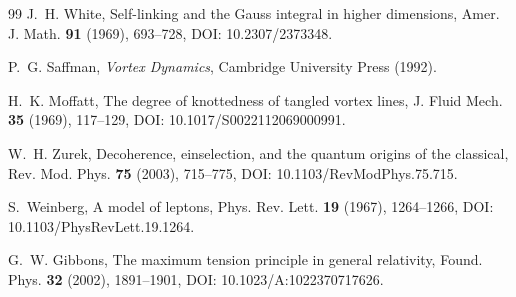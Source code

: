 \documentclass[11pt]{article}
\theoremstyle{definition}
\theoremstyle{plain}
\theoremstyle{remark}
\begin{document}
\begin{thebibliography}{99}
            J.~H. White,
            \newblock Self-linking and the Gauss integral in higher dimensions,
            \newblock Amer. J. Math. \textbf{91} (1969), 693--728,
            \newblock DOI: 10.2307/2373348.

            P.~G. Saffman,
            \newblock \emph{Vortex Dynamics},
            \newblock Cambridge University Press (1992).

            H.~K. Moffatt,
            \newblock The degree of knottedness of tangled vortex lines,
            \newblock J. Fluid Mech. \textbf{35} (1969), 117--129,
            \newblock DOI: 10.1017/S0022112069000991.

            W.~H. Zurek,
            \newblock Decoherence, einselection, and the quantum origins of the classical,
            \newblock Rev. Mod. Phys. \textbf{75} (2003), 715--775,
            \newblock DOI: 10.1103/RevModPhys.75.715.

            S.~Weinberg,
            \newblock A model of leptons,
            \newblock Phys. Rev. Lett. \textbf{19} (1967), 1264--1266,
            \newblock DOI: 10.1103/PhysRevLett.19.1264.

            G.~W. Gibbons,
            \newblock The maximum tension principle in general relativity,
            \newblock Found. Phys. \textbf{32} (2002), 1891--1901,
            \newblock DOI: 10.1023/A:1022370717626.

        \end{thebibliography}
\end{document}
